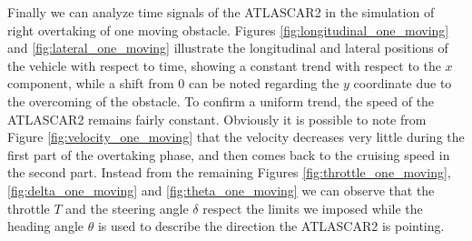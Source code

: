 Finally we can analyze time signals of the ATLASCAR2 in the simulation of right overtaking of one moving obstacle. Figures \ref{fig:longitudinal_one_moving} and \ref{fig:lateral_one_moving} illustrate the longitudinal and lateral positions of the vehicle with respect to time, showing a constant trend with respect to the $x$ component, while a shift from $0$ can be noted regarding the $y$ coordinate due to the overcoming of the obstacle. 
To confirm a uniform trend, the speed of the ATLASCAR2 remains fairly constant. Obviously it is possible to note from Figure \ref{fig:velocity_one_moving} that the velocity decreases very little during the first part of the overtaking phase, and then comes back to the cruising speed in the second part. Instead from the remaining Figures \ref{fig:throttle_one_moving}, \ref{fig:delta_one_moving} and \ref{fig:theta_one_moving} we can observe that the throttle $T$ and the steering angle $\delta$ respect the limits we imposed while the heading angle $\theta$ is used to describe the direction the ATLASCAR2 is pointing.
